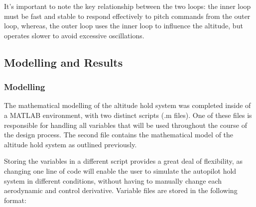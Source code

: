 \documentclass[stu, a4paper, 12pt, floatsintext]{apa7}
\numberwithin{figure}{section}
\numberwithin{table}{section}
\numberwithin{equation}{section}
\begin{document}
It's important to note the key relationship between the two loops: the inner loop must be fast and stable to respond effectively to pitch commands from the outer loop, whereas, the outer loop uses the inner loop to influence the altitude, but operates slower to avoid excessive oscillations. 

\subsection{Modelling and Results}
\subsubsection{Modelling}
The mathematical modelling of the altitude hold system was completed inside of a MATLAB environment, with two distinct scripts (.m files). One of these files is responsible for handling all variables that will be used throughout the course of the design process. The second file contains the mathematical model of the altitude hold system as outlined previously. 

Storing the variables in a different script provides a great deal of flexibility, as changing one line of code will enable the user to simulate the autopilot hold system in different conditions, without having to manually change each aerodynamic and control derivative. Variable files are stored in the following format:
\end{document}
